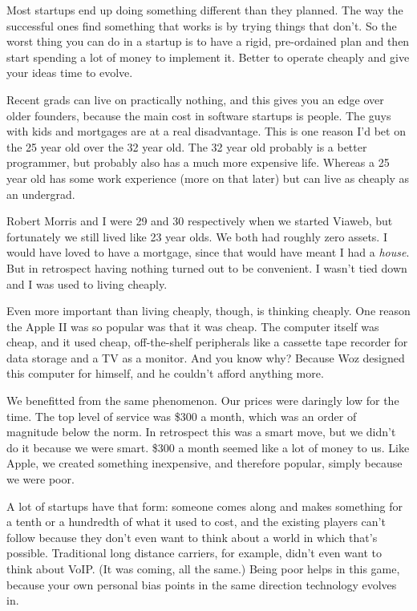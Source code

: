 Most startups end up doing something different than they planned. The
way the successful ones find something that works is by trying things
that don't. So the worst thing you can do in a startup is to have a
rigid, pre-ordained plan and then start spending a lot of money to
implement it. Better to operate cheaply and give your ideas time to
evolve.

Recent grads can live on practically nothing, and this gives you an edge
over older founders, because the main cost in software startups is
people. The guys with kids and mortgages are at a real disadvantage.
This is one reason I'd bet on the 25 year old over the 32 year old. The
32 year old probably is a better programmer, but probably also has a
much more expensive life. Whereas a 25 year old has some work experience
(more on that later) but can live as cheaply as an undergrad.

Robert Morris and I were 29 and 30 respectively when we started Viaweb,
but fortunately we still lived like 23 year olds. We both had roughly
zero assets. I would have loved to have a mortgage, since that would
have meant I had a \emph{house}. But in retrospect having nothing turned
out to be convenient. I wasn't tied down and I was used to living
cheaply.

Even more important than living cheaply, though, is thinking cheaply.
One reason the Apple II was so popular was that it was cheap. The
computer itself was cheap, and it used cheap, off-the-shelf peripherals
like a cassette tape recorder for data storage and a TV as a monitor.
And you know why? Because Woz designed this computer for himself, and he
couldn't afford anything more.

We benefitted from the same phenomenon. Our prices were daringly low for
the time. The top level of service was \$300 a month, which was an order
of magnitude below the norm. In retrospect this was a smart move, but we
didn't do it because we were smart. \$300 a month seemed like a lot of
money to us. Like Apple, we created something inexpensive, and therefore
popular, simply because we were poor.

A lot of startups have that form: someone comes along and makes
something for a tenth or a hundredth of what it used to cost, and the
existing players can't follow because they don't even want to think
about a world in which that's possible. Traditional long distance
carriers, for example, didn't even want to think about VoIP. (It was
coming, all the same.) Being poor helps in this game, because your own
personal bias points in the same direction technology evolves in.

